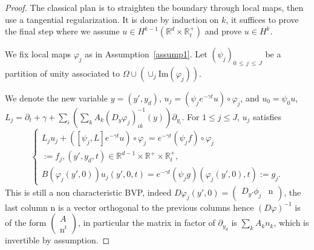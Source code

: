 \documentclass[10pt]{amsart}
\theoremstyle{definition}\newtheorem{defi}[theo]{Definition}\newtheorem{rema}[theo]{Remark}\newtheorem{exam}[theo]{Example}\newtheorem{exem}[theo]{Example}\newtheorem{nota}[theo]{Notation}
\newcommand{\R}{\mathbb{R}}
\newcommand{\rmn}{\mathrm{n}}
\renewcommand{\Im}{\mathrm{Im}}
\begin{document}
\begin{proof}
The classical plan is to straighten the boundary through local maps, then use a tangential regularization. It is done by induction on $k$, it suffices to prove the final step where we assume $u\in H^{k-1}(\R^d\times \R_t^+)$ and prove $u\in H^k$.


We fix local maps $\varphi_j$ as in Assumption~\ref{assump1}. Let $(\psi_j)_{0\,\leq\,j\,\leq\,J}$ be a partition of unity associated to $\Omega\cup (\cup_j\Im(\varphi_j))$.


\noindent We denote the new variable $y=(y',y_d)$, $u_j=(\psi_je^{-\gamma t}u)
\circ\varphi_j$, and $u_0=\psi_0 u$, $L_j=\partial_t+\gamma+\sum_i\left(\sum_k A_k(D_y\varphi_j)^{-1}_{ik}(y)\right)
\partial_{y_i}$. For $1\leq j\leq J$, $u_j$ satisfies
\begin{equation}\label{eqredresse}
\left\{
\begin{array}{ll}
L_ju_j+\left([\psi_j,L]e^{-\gamma t}u\right)\circ \varphi_j=e^{-\gamma t}(\psi_jf)\circ \varphi_j\\
:=f_j, \left(y',y_d,t\right)\in \R^{d-1}\times \R^+\times \R_t^+,
\\
B(\varphi_j(y',0))u_j(y',0,t)=e^{-\gamma t}(\psi_j g)(\varphi_j(y',0),t):=g_j.
\end{array}
\right.
\end{equation}
This is still a non characteristic BVP, indeed $D\varphi_j(y',0)=
(\begin{smallmatrix} D_{y'}\phi_j & \rmn
\end{smallmatrix})$, the
last column $\rmn$ is a vector orthogonal to the previous columns hence $(D\varphi)^{-1}$ is of the form $
(\begin{smallmatrix} A\\ \rmn^t
\end{smallmatrix})$, in particular the matrix in factor of
$\partial_{y_d}$ is $\sum_kA_k n_k$, which is invertible by assumption.



\end{proof}
\end{document}

